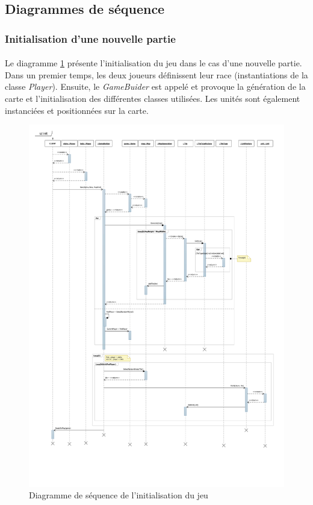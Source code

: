 \subsection{Diagrammes de séquence}
\label{diagSequence}
\subsubsection{Initialisation d'une nouvelle partie}

\paragraph{}
Le diagramme \ref{fig:sd_init} présente l'initialisation du jeu dans le cas d'une nouvelle partie.
Dans un premier temps, les deux joueurs définissent leur race (instantiations de la classe \emph{Player}).
Ensuite, le \emph{GameBuider} est appelé et provoque la génération de la carte et l'initialisation des différentes classes utilisées.
Les unités sont également instanciées et positionnées sur la carte.

\begin{figure}[h]
  \centering
  \includegraphics[width=13cm]{schemas/sd_init.png}
  \caption{Diagramme de séquence de l'initialisation du jeu}
  \label{fig:sd_init}
\end{figure}

